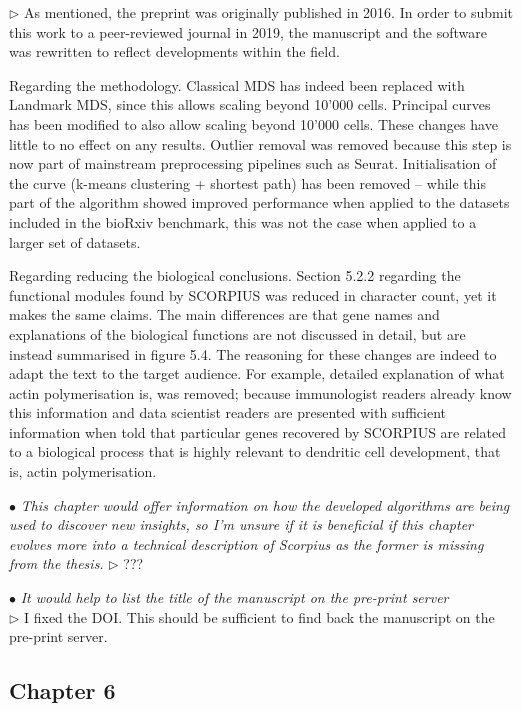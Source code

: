 \documentclass[10pt]{article}
\newcommand{\exam}[2][\  ]{\hspace{0pt}\marginpar{\color{red}#1}$\bullet$ \textit{#2}}
\newcommand{\answ}[1]{{\color{blue} $\triangleright$ #1}}
\begin{document}
{{\answ{As mentioned, the preprint was originally published in 2016. In order to submit this work to a peer-reviewed journal in 2019, the manuscript and the software was rewritten to reflect developments within the field.

Regarding the methodology. Classical MDS has indeed been replaced with Landmark MDS, since this allows scaling beyond 10'000 cells. Principal curves has been modified to also allow scaling beyond 10'000 cells. These changes have little to no effect on any results. Outlier removal was removed because this step is now part of mainstream preprocessing pipelines such as Seurat. Initialisation of the curve (k-means clustering + shortest path) has been removed -- while this part of the algorithm showed improved performance when applied to the datasets included in the bioRxiv benchmark, this was not the case when applied to a larger set of datasets. 

Regarding reducing the biological conclusions. Section 5.2.2 regarding the functional modules found by SCORPIUS was reduced in character count, yet it makes the same claims. The main differences are that gene names and explanations of the biological functions are not discussed in detail, but are instead summarised in figure 5.4. The reasoning for these changes are indeed to adapt the text to the target audience.
For example, detailed explanation of what actin polymerisation is, was removed; because immunologist readers already know this information and data scientist readers are presented with sufficient information when told that particular genes recovered by SCORPIUS are related to a biological process that is highly relevant to dendritic cell development, that is, actin polymerisation.}



\exam{This chapter would offer information on how the developed algorithms
	are being used to discover new insights, so I’m unsure if it is beneficial if this
	chapter evolves more into a technical description of Scorpius as the former is
	missing from the thesis.}
\answ{???}


\exam{It would help to list the title of the manuscript on the pre-print server} \\
\answ{I fixed the DOI. This should be sufficient to find back the manuscript on the pre-print server.}


\subsection{Chapter 6}

}}
\end{document}
